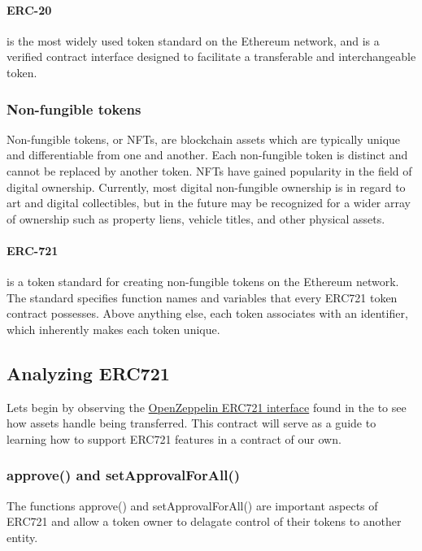 \documentclass{article}
\theoremstyle{theorem}
\theoremstyle{definition}
\theoremstyle{remark}
\begin{document}
\begin{itemize}
\paragraph{ERC-20} is the most widely used token standard on the Ethereum network, and is a verified contract interface designed to facilitate a transferable and interchangeable token. 

\end{itemize}

\subsubsection{Non-fungible tokens}  
Non-fungible tokens, or NFTs, are blockchain assets which are typically unique and differentiable from one and another. Each non-fungible token is distinct and cannot be replaced by another token. NFTs have gained popularity in the field of digital ownership. Currently, most digital non-fungible ownership is in regard to art and digital collectibles, but in the future may be recognized for a wider array of ownership such as property liens, vehicle titles, and other physical assets.
\begin{itemize}

\paragraph{ERC-721} is a token standard for creating non-fungible tokens on the Ethereum network. The standard specifies function names and variables that every ERC721 token contract  possesses. Above anything else, each token associates with an identifier, which inherently makes each token unique.

\end{itemize}

\subsection{Analyzing ERC721} \label{analyzing}
\medskip\noindent
Lets begin by observing the \href{https://github.com/OpenZeppelin/openzeppelin-contracts/blob/master/contracts/token/ERC721/IERC721.sol}{OpenZeppelin ERC721 interface} found in the \cite{OZ} to see how assets handle being transferred. This contract will serve as a guide to learning how to support ERC721 features in a contract of our own.


\subsubsection{approve() and setApprovalForAll()} \label{approval}
The functions \colorbox{Gainsboro!60!Lavender}{approve()} and \colorbox{Gainsboro!60!Lavender}{setApprovalForAll()} are important aspects of ERC721 and allow a token owner to delagate control of their tokens to another entity.
\end{document}
